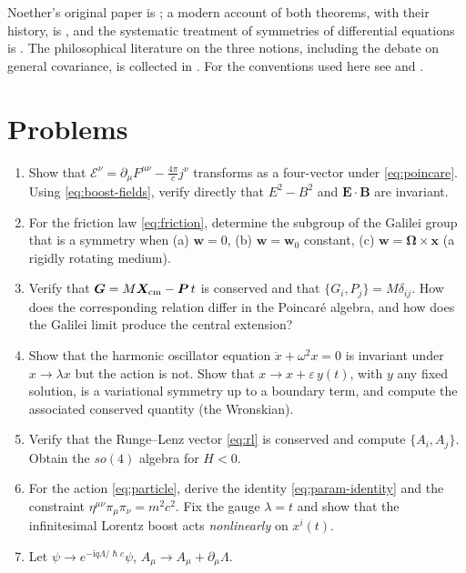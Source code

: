 \documentclass[11pt,a4paper,openany]{book}
\theoremstyle{definition}
\theoremstyle{plain}
\theoremstyle{remark}
\DeclareRobustCommand{\hbar}{\hslash}
\newcommand{\ii}{\mathrm{i}}
\newcommand{\eps}{\varepsilon}
\newcommand{\vx}{\bm{x}}
\newcommand{\vE}{\bm{E}}
\newcommand{\vB}{\bm{B}}
\newcommand{\Poi}[2]{\{#1,#2\}}
\begin{document}
Noether's original paper is \cite{noether}; a modern account of both theorems,
with their history, is \cite{ks}, and the systematic treatment of symmetries of
differential equations is \cite{olver}. The philosophical literature on
the three notions, including the debate on general covariance, is collected in
\cite{bc,earman,norton}. For the conventions used here see \cite{ll} and
\cite{jackson}.

\section*{Problems}

\begin{enumerate}[leftmargin=2.2em,itemsep=4pt,label=\textbf{P\thechapter.\arabic*}]
\item Show that $\mathcal E^\nu=\partial_\mu F^{\mu\nu}-\tfrac{4\pi}{c}j^\nu$
  transforms as a four-vector under \eqref{eq:poincare}. Using
  \eqref{eq:boost-fields}, verify directly that $E^2-B^2$ and
  $\vE\!\cdot\!\vB$ are invariant.
\item For the friction law \eqref{eq:friction}, determine the subgroup of the
  Galilei group that is a symmetry when (a) $\bm w=0$, (b) $\bm w=\bm w_0$
  constant, (c) $\bm w=\bm\Omega\times\vx$ (a rigidly rotating medium).
\item Verify that $\bm G=M\bm X_{\rm cm}-\bm P\,t$ is conserved and that
  $\Poi{G_i}{P_j}=M\delta_{ij}$. How does the corresponding relation differ in
  the Poincar\'e algebra, and how does the Galilei limit produce the central
  extension?
\item Show that the harmonic oscillator equation $\ddot x+\omega^2x=0$ is
  invariant under $x\to\lambda x$ but the action is not. Show that
  $x\to x+\eps\,y(t)$, with $y$ any fixed solution, is a variational symmetry
  up to a boundary term, and compute the associated conserved quantity
  (the Wronskian).
\item Verify that the Runge--Lenz vector \eqref{eq:rl} is conserved and
  compute $\Poi{A_i}{A_j}$. Obtain the $so(4)$ algebra for $H<0$.
\item For the action \eqref{eq:particle}, derive the identity
  \eqref{eq:param-identity} and the constraint
  $\eta^{\mu\nu}\pi_\mu\pi_\nu=m^2c^2$. Fix the gauge $\lambda=t$ and
  show that the infinitesimal Lorentz boost acts \emph{nonlinearly}
  on $x^i(t)$.
\item Let $\psi\to e^{-\ii q\Lambda/\hbar c}\psi$, $A_\mu\to A_\mu+\partial_\mu\Lambda$.

\end{enumerate}
\end{document}
